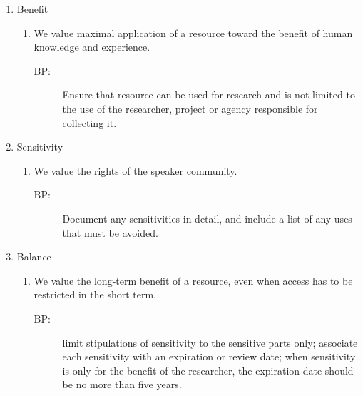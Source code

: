 \documentclass{article}
\begin{document}
\begin{enumerate}
\begin{enumerate}
\begin{enumerate}
    \end{enumerate}
    \item Benefit
    \begin{enumerate}
      \item We value maximal application of a resource toward the benefit of human knowledge and experience.
      \begin{description}
        \item[BP:]  Ensure that resource can be used for research and is not limited to the use of the researcher, project or agency responsible for collecting it.
      \end{description}
    \end{enumerate}        
    \item Sensitivity
      \begin{enumerate}
        \item We value the rights of the speaker community.
      \begin{description}
        \item[BP:]  Document any sensitivities in detail, and include a list of any uses that must be avoided.
      \end{description}
    \end{enumerate}
    \item Balance
    \begin{enumerate}
      \item We value the long-term benefit of a resource, even when access has to be restricted in the short term.
      \begin{description}
       \item[BP:]  limit stipulations of sensitivity to the sensitive parts only; associate each sensitivity with an expiration or review date; when sensitivity is only for the benefit of the researcher, the expiration date should be no more than five years.
      \end{description}
    \end{enumerate}
  \end{enumerate}
\end{enumerate}
\end{document}
